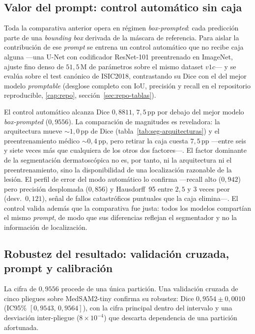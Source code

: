 \subsection{Valor del prompt: control automático sin caja}
\label{sec:seg-control-automatico}

Toda la comparativa anterior opera en régimen \emph{box-prompted}:
cada predicción parte de una \emph{bounding box} derivada de la
máscara de referencia. Para aislar la contribución de ese
\emph{prompt} se entrena un control automático que no recibe caja
alguna ---una U-Net con codificador ResNet-101 preentrenado en
ImageNet, ajuste fino denso de $51{,}5$\,M de parámetros sobre el
mismo dataset $v1c$--- y se evalúa sobre el test canónico de
ISIC2018, contrastando su Dice con el del mejor modelo
\emph{promptable} (desglose completo con IoU, precisión y recall en el
repositorio reproducible, \ref{cap:repo},
sección~\ref{sec:repo-tablas}).

El control automático alcanza Dice $0{,}8811$, $7{,}5$\,pp por debajo
del mejor modelo \emph{box-prompted} ($0{,}9556$). La comparación de
magnitudes es reveladora: la arquitectura mueve $\sim 1{,}0$\,pp de
Dice (tabla~\ref{tab:seg-arquitecturas}) y el preentrenamiento médico
$\sim 0{,}4$\,pp, pero retirar la caja cuesta $7{,}5$\,pp ---entre
seis y siete veces más que cualquiera de los otros dos factores---. El
factor dominante de la segmentación dermatoscópica no es, por tanto,
ni la arquitectura ni el preentrenamiento, sino la disponibilidad de
una localización razonable de la lesión. El perfil de error del modo automático lo confirma
---recall alto ($0{,}942$) pero precisión desplomada ($0{,}856$) y
Hausdorff~95 entre $2{,}5$ y $3$ veces peor (desv.\ $0{,}121$), señal
de fallos catastróficos puntuales que la caja elimina---. El control
valida además que la comparativa fue justa: todos los modelos
compartían el mismo \emph{prompt}, de modo que sus diferencias
reflejan el segmentador y no la información de localización.

\subsection{Robustez del resultado: validación cruzada, prompt y calibración}
\label{sec:seg-robustez}

La cifra de $0{,}9556$ procede de una única partición. Una validación
cruzada de cinco pliegues sobre MedSAM2-tiny confirma su robustez:
Dice $0{,}9554 \pm 0{,}0010$ (IC95\% $[0{,}9543,\, 0{,}9564]$), con la
cifra principal dentro del intervalo y una desviación inter-pliegue
($8\times 10^{-4}$) que descarta dependencia de una partición
afortunada.

